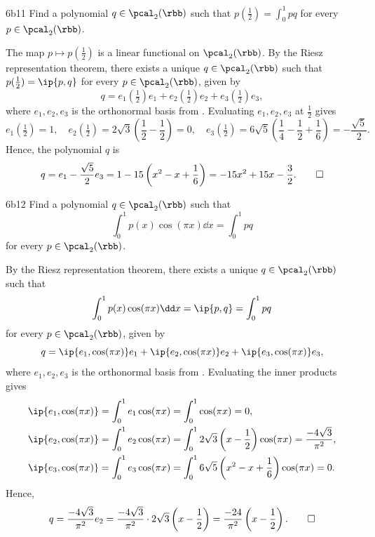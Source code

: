 \begin{exercise}{6b11}
    Find a polynomial $q \in \pcal_2(\rbb)$ such that $p\left(\tfrac{1}{2}\right) = \int_0^1 pq$ for every $p \in \pcal_2(\rbb)$.
\end{exercise}

\begin{sol}
    The map $p \mapsto p(\frac{1}{2})$ is a linear functional on $\pcal_2(\rbb)$.
    By the Riesz representation theorem, there exists a unique $q \in \pcal_2(\rbb)$ such that $p(\frac{1}{2}) = \ip{p, q}$ for every $p \in \pcal_2(\rbb)$, given by
    \[
        q = e_1\!\left(\tfrac{1}{2}\right)e_1 + e_2\!\left(\tfrac{1}{2}\right)e_2 + e_3\!\left(\tfrac{1}{2}\right)e_3,
    \]
    where $e_1, e_2, e_3$ is the orthonormal basis from .
    Evaluating $e_1, e_2, e_3$ at $\frac{1}{2}$ gives
    \[
        e_1(\tfrac{1}{2}) = 1, \quad
        e_2(\tfrac{1}{2}) = 2\sqrt{3}\left(\frac{1}{2} - \frac{1}{2}\right) = 0, \quad
        e_3(\tfrac{1}{2}) = 6\sqrt{5}\left(\frac{1}{4} - \frac{1}{2} + \frac{1}{6}\right) = -\frac{\sqrt{5}}{2}.
    \]
    Hence, the polynomial $q$ is
    \[
        q = e_1 - \frac{\sqrt{5}}{2}e_3 = 1 - 15\left(x^2 - x + \frac{1}{6}\right) = -15x^2 + 15x - \frac{3}{2}. \qedhere
    \]
\end{sol}

\begin{exercise}{6b12}
    Find a polynomial $q \in \pcal_2(\rbb)$ such that
    \[
        \int_0^1 p(x) \cos(\pi x)\dd x = \int_0^1 pq
    \]
    for every $p \in \pcal_2(\rbb)$.
\end{exercise}

\begin{sol}
    By the Riesz representation theorem, there exists a unique $q \in \pcal_2(\rbb)$ such that
    \[
        \int_0^1 p(x) \cos(\pi x)\dd x = \ip{p, q} = \int_0^1 pq
    \]
    for every $p \in \pcal_2(\rbb)$, given by
    \[
        q = \ip{e_1, \cos(\pi x)}e_1 + \ip{e_2, \cos(\pi x)}e_2 + \ip{e_3, \cos(\pi x)}e_3,
    \]
    where $e_1, e_2, e_3$ is the orthonormal basis from .
    Evaluating the inner products gives
    \begin{align*}
        \ip{e_1, \cos(\pi x)} &= \int_0^1 e_1 \cos(\pi x) = \int_0^1 \cos(\pi x) = 0, \\
        \ip{e_2, \cos(\pi x)} &= \int_0^1 e_2 \cos(\pi x) = \int_0^1 2\sqrt{3}\left(x - \frac{1}{2}\right) \cos(\pi x) = \frac{-4\sqrt{3}}{\pi^2}, \\
        \ip{e_3, \cos(\pi x)} &= \int_0^1 e_3 \cos(\pi x) = \int_0^1 6\sqrt{5}\left(x^2 - x + \frac{1}{6}\right) \cos(\pi x) = 0.
    \end{align*}
    Hence,
    \[
        q = \frac{-4\sqrt{3}}{\pi^2} e_2 = \frac{-4\sqrt{3}}{\pi^2} \cdot 2\sqrt{3}\left(x - \frac{1}{2}\right) = \frac{-24}{\pi^2}\left(x - \frac{1}{2}\right). \qedhere
    \]
\end{sol}

